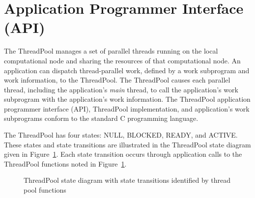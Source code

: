 \section{Application Programmer Interface (API)}

The ThreadPool manages a set of parallel threads running on the local computational node and sharing the resources of that computational node.
%
An application can dispatch thread-parallel work, defined by a work subprogram and work information, to the ThreadPool.
%
The ThreadPool causes each parallel thread, including the application's \emph{main} thread, to call the application's work subprogram with the application's work information.
%
The ThreadPool application programmer interface (API), ThreadPool implementation, and application's work subprograms conform to the standard C programming language.


The ThreadPool has four states: NULL, BLOCKED, READY, and ACTIVE.
%
These states and state transitions are illustrated in the ThreadPool state diagram given in Figure~\ref{fig:ThreadPoolStates}.
%
Each state transition occurs through application calls to the ThreadPool functions noted in Figure~\ref{fig:ThreadPoolStates}.
%
\begin{figure}[h]
\begin{center}
\caption{ThreadPool state diagram with state transitions identified by thread pool functions}
\label{fig:ThreadPoolStates}
\end{center}
\end{figure}

